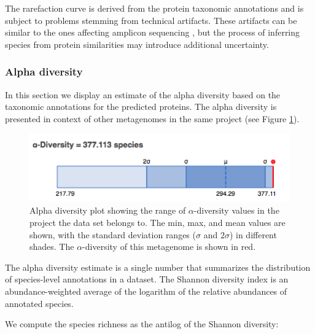 \documentclass[12pt,fullpage]{report}
\begin{document}
The rarefaction curve is derived from the protein taxonomic annotations and is subject to problems stemming from technical artifacts. These artifacts can be similar to the ones affecting amplicon sequencing \cite{RARE}, but the process of inferring species from protein similarities may introduce additional uncertainty.

\subsubsection{Alpha diversity}
In this section we display an estimate of the alpha diversity based on the taxonomic annotations for the predicted proteins. The alpha diversity is presented in context of other metagenomes in the same project (see Figure \ref{fig:alpha-diversity}).

\begin{figure}
\begin{center}
\includegraphics[width=6in]{Images/alpha-diversity.png}
\end{center}
\caption{
Alpha diversity plot showing the range of  {$\alpha$}-diversity values in the project the data set belongs to. The min, max, and mean values are shown, with the standard deviation ranges ($\sigma$ and $2\sigma$) in different shades. The {$\alpha$}-diversity of this metagenome is shown in red.
}
\label{fig:alpha-diversity}
\end{figure}

The alpha diversity estimate is a single number that summarizes the distribution of species-level annotations in a dataset.   The Shannon diversity index is an abundance-weighted average of the logarithm of the relative abundances of annotated species.

We compute the species richness as the antilog of the Shannon diversity:
\end{document}
